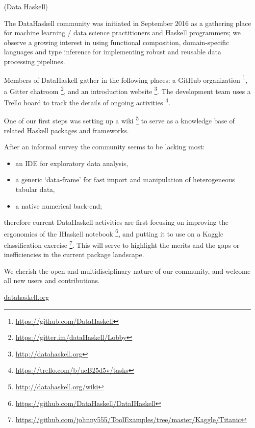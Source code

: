 \documentclass[DIV16,twocolumn,10pt]{scrreprt}
\begin{document}
\begin{hcarentry}{(Data Haskell)}
\makeheader

The DataHaskell community was initiated in September 2016 as a gathering place for machine learning / data science practitioners and Haskell programmers; we observe a growing interest in using functional composition, domain-specific languages and type inference for implementing robust and reusable data processing pipelines.


Members of DataHaskell gather in the following places: a GitHub organization \footnote{\url{https://github.com/DataHaskell}}, a Gitter chatroom \footnote{\url{https://gitter.im/dataHaskell/Lobby}}, and an introduction website \footnote{\url{http://datahaskell.org}}. The development team uses a Trello board to track the details of ongoing activities \footnote{\url{https://trello.com/b/ucB25d5v/tasks}}.

One of our first steps was setting up a wiki \footnote{\url{http://datahaskell.org/wiki}} to serve as a knowledge base of related Haskell packages and frameworks.

After an informal survey the community seems to be lacking most:
\begin{itemize} 
\item an IDE for exploratory data analysis,
\item a generic `data-frame' for fast import and manipulation of heterogeneous tabular data,
\item a native numerical back-end;
\end{itemize}
therefore current DataHaskell activities are first focusing on improving the ergonomics of the IHaskell notebook \footnote{\url{https://github.com/DataHaskell/DataIHaskell}}, and putting it to use on a Kaggle classification exercise \footnote{\url{https://github.com/johnny555/ToolExamples/tree/master/Kaggle/Titanic}}. This will serve to highlight the merits and the gaps or inefficiencies in the current package landscape.

We cherish the open and multidisciplinary nature of our community, and welcome all new users and contributions.

\FurtherReading
  \url{datahaskell.org}
\end{hcarentry}
\end{document}
